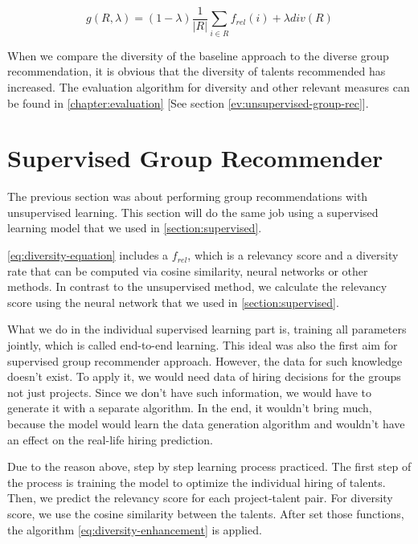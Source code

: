 \begin{equation}
g ( R , \lambda ) = ( 1 - \lambda ) \frac { 1 } { | R | } \sum _ { i \in R } f _ { r e l } ( i ) + \lambda d i v ( R )
\label{eq:diversity-equation}
\end{equation}

When we compare the diversity of the baseline approach to the diverse group recommendation, it is obvious that the diversity of talents recommended has increased. The evaluation algorithm for diversity and other relevant measures can be found in \autoref{chapter:evaluation} [See section \ref{ev:unsupervised-group-rec}].

\section{Supervised Group Recommender}\label{section:supervised-group-rec}

The previous section was about performing group recommendations with unsupervised learning. This section will do the same job using a supervised learning model that we used in \autoref{section:supervised}.


\autoref{eq:diversity-equation} includes a $f _ { rel } $, which is a relevancy score and a diversity rate that can be computed via cosine similarity, neural networks or other methods. In contrast to the unsupervised method, we calculate the relevancy score using the neural network that we used in \autoref{section:supervised}.

What we do in the individual supervised learning part is, training all parameters jointly, which is called end-to-end learning. This ideal was also the first aim for supervised group recommender approach. However, the data for such knowledge doesn't exist. To apply it, we would need data of hiring decisions for the groups not just projects. Since we don't have such information, we would have to generate it with a separate algorithm. In the end, it wouldn't bring much, because the model would learn the data generation algorithm and wouldn't have an effect on the real-life hiring prediction.


Due to the reason above, step by step learning process practiced. The first step of the process is training the model to optimize the individual hiring of talents. Then, we predict the relevancy score for each project-talent pair. For diversity score, we use the cosine similarity between the talents. After set those functions, the algorithm \ref{eq:diversity-enhancement} is applied.



